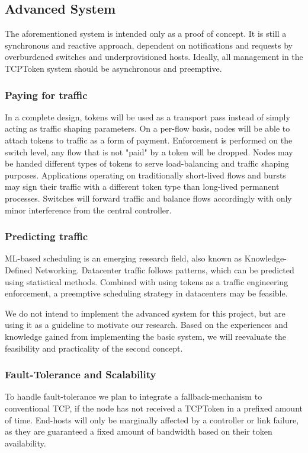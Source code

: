 \documentclass[sigconf]{acmart}
\begin{document}
\subsection{Advanced System}
The aforementioned system is intended only as a proof of concept. It is still a  synchronous and reactive approach, dependent on notifications and requests by overburdened switches and underprovisioned hosts. 
Ideally, all management in the TCPToken system should be asynchronous and preemptive. 
\subsubsection{ Paying for traffic}
In a complete design, tokens will be used as a transport pass instead of simply acting as traffic shaping parameters. On a per-flow basis, nodes will be able to attach tokens to traffic as a form of payment. Enforcement is performed on the switch level, any flow that is not "paid" by a token will be dropped. Nodes may be handed different types of tokens to serve load-balancing and traffic shaping purposes. Applications operating on traditionally short-lived flows and bursts may sign their traffic with a different token type than long-lived permanent processes. Switches will forward traffic and balance flows accordingly with only minor interference from the central controller.

\subsubsection{Predicting traffic}
ML-based scheduling is an emerging research field, also known as Knowledge-Defined Networking. Datacenter traffic follows patterns, which can be predicted using statistical methods.
Combined with using tokens as a traffic engineering enforcement, a preemptive scheduling strategy in datacenters may be feasible. 

We do not intend to implement the advanced system for this project, but are using it as a guideline to motivate our research. Based on the experiences and knowledge gained from implementing the basic system, we will reevaluate the feasibility and practicality of the second concept.



\subsubsection{Fault-Tolerance and Scalability}
To handle fault-tolerance we plan to integrate a fallback-mechanism to conventional TCP, if the node has not received a TCPToken in a prefixed amount of time. End-hosts will only be marginally affected by a controller or link failure, as they are guaranteed a fixed amount of bandwidth based on their token availability.
\end{document}
